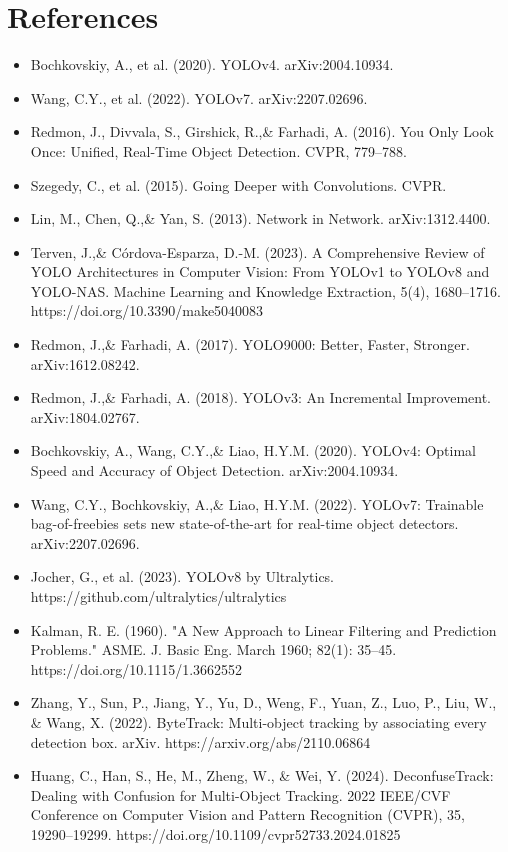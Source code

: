 \documentclass[11pt]{article}
\begin{document}
\newpage
\section{References}
\begin{itemize}
    \item Bochkovskiy, A., et al. (2020). YOLOv4. arXiv:2004.10934.
    \item Wang, C.Y., et al. (2022). YOLOv7. arXiv:2207.02696.
    \item Redmon, J., Divvala, S., Girshick, R.,\& Farhadi, A. (2016). You Only Look Once: Unified, Real-Time Object Detection. CVPR, 779–788.
    \item Szegedy, C., et al. (2015). Going Deeper with Convolutions. CVPR.
    \item Lin, M., Chen, Q.,\& Yan, S. (2013). Network in Network. arXiv:1312.4400.
    \item Terven, J.,\& Córdova-Esparza, D.-M. (2023). A Comprehensive Review of YOLO Architectures in Computer Vision: From YOLOv1 to YOLOv8 and YOLO-NAS. Machine Learning and Knowledge Extraction, 5(4), 1680–1716. https://doi.org/10.3390/make5040083
    \item Redmon, J.,\& Farhadi, A. (2017). YOLO9000: Better, Faster, Stronger. arXiv:1612.08242.
    \item Redmon, J.,\& Farhadi, A. (2018). YOLOv3: An Incremental Improvement. arXiv:1804.02767.
    \item Bochkovskiy, A., Wang, C.Y.,\& Liao, H.Y.M. (2020). YOLOv4: Optimal Speed and Accuracy of Object Detection. arXiv:2004.10934.
    \item Wang, C.Y., Bochkovskiy, A.,\& Liao, H.Y.M. (2022). YOLOv7: Trainable bag-of-freebies sets new state-of-the-art for real-time object detectors. arXiv:2207.02696.
    \item Jocher, G., et al. (2023). YOLOv8 by Ultralytics. https://github.com/ultralytics/ultralytics 
    \item Kalman, R. E. (1960). "A New Approach to Linear Filtering and Prediction Problems." ASME. J. Basic Eng. March 1960; 82(1): 35–45. https://doi.org/10.1115/1.3662552
    \item Zhang, Y., Sun, P., Jiang, Y., Yu, D., Weng, F., Yuan, Z., Luo, P., Liu, W., \& Wang, X. (2022). ByteTrack: Multi-object tracking by associating every detection box. arXiv. https://arxiv.org/abs/2110.06864
    \item Huang, C., Han, S., He, M., Zheng, W., \& Wei, Y. (2024). DeconfuseTrack: Dealing with Confusion for Multi-Object Tracking. 2022 IEEE/CVF Conference on Computer Vision and Pattern Recognition (CVPR), 35, 19290–19299. https://doi.org/10.1109/cvpr52733.2024.01825

\end{itemize}
\end{document}
